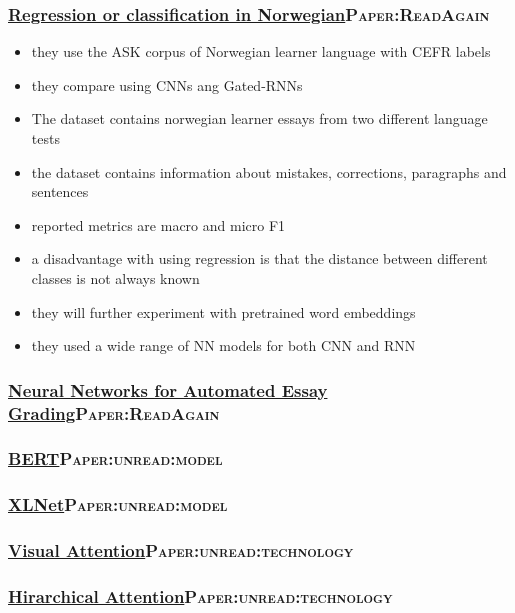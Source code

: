 \documentclass[11pt]{article}
\begin{document}
\subsubsection{\href{./cs/Automatic\_Essay\_Grading\_Norwegian.pdf}{Regression or classification in Norwegian}\hfill{}\textsc{Paper:ReadAgain}}
\label{sec:org339477a}
\begin{itemize}
\item they use the ASK corpus of Norwegian learner language with CEFR labels
\item they compare using CNNs ang Gated-RNNs
\item The dataset contains norwegian learner essays from two different language tests
\item the dataset contains information about mistakes, corrections, paragraphs and sentences
\item reported metrics are macro and micro F1
\item a disadvantage with using regression is that the distance between different classes is not always known
\item they will further experiment with pretrained word embeddings
\item they used a wide range of NN models for both CNN and RNN
\end{itemize}
\subsubsection{\href{./cs/NN\_For\_Automated\_Essay\_Grading.pdf}{Neural Networks for Automated Essay Grading}\hfill{}\textsc{Paper:ReadAgain}}
\label{sec:orgcdaa187}
\subsubsection{\href{./cs/BERT.pdf}{BERT}\hfill{}\textsc{Paper:unread:model}}
\label{sec:orga29ba21}
\subsubsection{\href{./cs/XLNet.pdf}{XLNet}\hfill{}\textsc{Paper:unread:model}}
\label{sec:orgbf8544b}
\subsubsection{\href{./cs/VisualAttention.pdf}{Visual Attention}\hfill{}\textsc{Paper:unread:technology}}
\label{sec:org03e9e15}
\subsubsection{\href{./cs/HirarcicalAttention.pdf}{Hirarchical Attention}\hfill{}\textsc{Paper:unread:technology}}
\label{sec:org7eacb9f}
\end{document}
